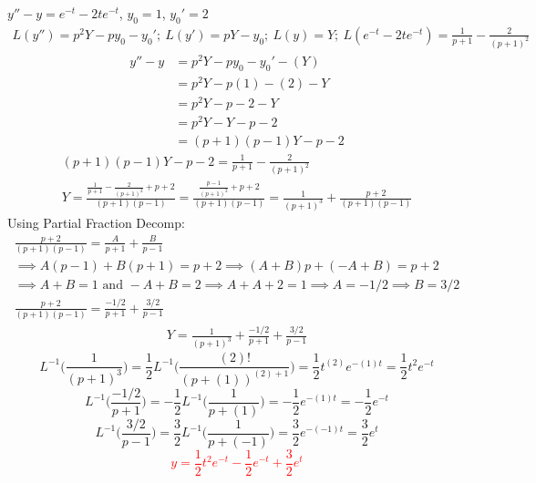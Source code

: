 \item [12.] $y''-y= e^{-t}-2te^{-t}$, $y_0=1$, $y_0'=2$
\begin{gather*}
    L(y'')=p^2Y-py_0-y_0';\:
    L(y')=pY-y_0;\:
    L(y)=Y;\:
    L(e^{-t}-2te^{-t})=\frac{1}{p+1}-\frac{2}{(p+1)^2}
\end{gather*}
\begin{align*}
    y''- y
    &=p^2Y-py_0-y_0'-(Y)\\
    &=p^2Y-p(1)-(2)-Y\\
    &=p^2Y-p-2-Y\\
    &=p^2Y-Y-p-2\\
    &=(p+1)(p-1)Y-p-2
\end{align*}
\begin{gather*}
    (p+1)(p-1)Y-p-2=\frac{1}{p+1}-\frac{2}{(p+1)^2}\\
    Y=\frac{\frac{1}{p+1}-\frac{2}{(p+1)^2}+p+2}{(p+1)(p-1)}
    =\frac{\frac{p-1}{(p+1)^2}+p+2}{(p+1)(p-1)}
    =\frac{1}{(p+1)^3}+\frac{p+2}{(p+1)(p-1)}
\end{gather*}
Using Partial Fraction Decomp:
\begin{gather*}
    \frac{p+2}{(p+1)(p-1)}=\frac{A}{p+1}+\frac{B}{p-1}\\
    \implies A(p-1)+B(p+1) = p+2
    \implies (A+B)p+(-A+B) = p+2\\
    \implies A+B = 1 \text { and }-A+B = 2
    \implies A+A+2 = 1 \implies A = -1/2 \implies B = 3/2\\
    \frac{p+2}{(p+1)(p-1)}=\frac{-1/2}{p+1}+\frac{3/2}{p-1}
\end{gather*}
\begin{gather*}
    Y=\frac{1}{(p+1)^3}+\frac{-1/2}{p+1}+\frac{3/2}{p-1}
\end{gather*}
\begin{equation*}
    L^{-1}\Bigg(\frac{1}{(p+1)^3}\Bigg) 
    = \frac{1}{2}L^{-1}\Bigg(\frac{(2)!}{(p+(1))^{(2)+1}}\Bigg) 
    =\frac{1}{2}t^{(2)} e^{-(1)t}
    =\frac{1}{2}t^2e^{-t}
    \tag{By \( L6 \)}
\end{equation*}
\begin{equation*}
    L^{-1}\Bigg(\frac{-1/2}{p+1}\Bigg) 
    = -\frac{1}{2}L^{-1}\Bigg(\frac{1}{p+(1)}\Bigg) 
    =-\frac{1}{2}e^{-(1)t}
    =-\frac{1}{2}e^{-t}
    \tag{By \( L2 \)}
\end{equation*}
\begin{equation*}
    L^{-1}\Bigg(\frac{3/2}{p-1}\Bigg) 
    = \frac{3}{2}L^{-1}\Bigg(\frac{1}{p+(-1)}\Bigg) 
    =\frac{3}{2}e^{-(-1)t}
    =\frac{3}{2}e^{t}
    \tag{By \( L2 \)}
\end{equation*}
\textcolor{red}{\[
   y= \frac{1}{2}t^2e^{-t}-\frac{1}{2}e^{-t}+\frac{3}{2}e^{t}
\]}